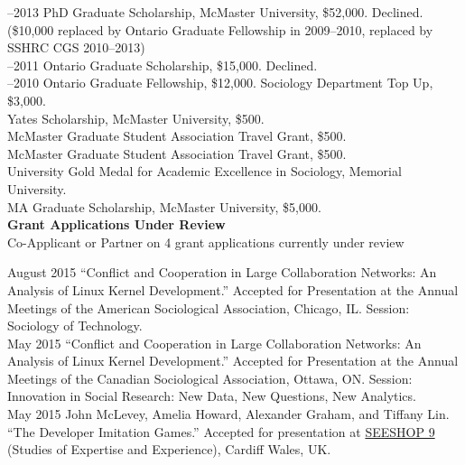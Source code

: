 \documentclass[9pt,usenames,dvipsnames]{article}
\begin{document}
–2013 PhD Graduate Scholarship, McMaster University, \$52,000. Declined. (\$10,000 replaced by Ontario Graduate Fellowship in 2009–2010, replaced by SSHRC CGS 2010–2013)\\

–2011 Ontario Graduate Scholarship, \$15,000. Declined.\\

–2010 Ontario Graduate Fellowship, \$12,000. Sociology Department Top Up, \$3,000.\\

 Yates Scholarship, McMaster University, \$500.\\

 McMaster Graduate Student Association Travel Grant, \$500.\\

 McMaster Graduate Student Association Travel Grant, \$500.\\

 University Gold Medal for Academic Excellence in Sociology, Memorial University.\\

 MA Graduate Scholarship, McMaster University, \$5,000.\\

\noindent \textbf{Grant Applications Under Review} \\

\ind Co-Applicant or Partner on 4 grant applications currently under review \\ 


\ind August 2015 ``Conflict and Cooperation in Large Collaboration Networks: An Analysis of Linux Kernel Development.'' Accepted for Presentation at the Annual Meetings of the American Sociological Association, Chicago, IL. Session: Sociology of Technology. \\

\ind May 2015 ``Conflict and Cooperation in Large Collaboration Networks: An Analysis of Linux Kernel Development.'' Accepted for Presentation at the Annual Meetings of the Canadian Sociological Association, Ottawa, ON. Session: Innovation in Social Research: New Data, New Questions, New Analytics.\\

\ind May 2015 John McLevey, Amelia Howard, Alexander Graham, and Tiffany Lin. ``The Developer Imitation Games.'' Accepted for presentation at \href{http://www.cf.ac.uk/socsi/contactsandpeople/harrycollins/expertise-project/seeshophome.html}{SEESHOP 9} (Studies of Expertise and Experience), Cardiff Wales, UK. \\
\end{document}
